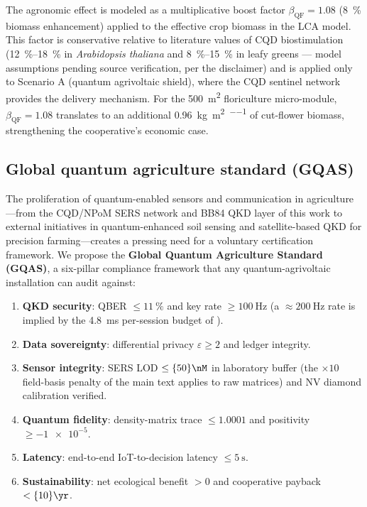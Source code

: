 \documentclass[11pt,a4paper]{article}
\begin{document}
The agronomic effect is modeled as a multiplicative boost factor $\beta_{\mathrm{QF}} =\num{1.08}$ (\qty{8}{\percent} biomass enhancement) applied to the effective crop biomass in the LCA model. This factor is conservative relative to literature values of CQD biostimulation (\qtyrange{12}{18}{\percent} in \textit{Arabidopsis thaliana} and \qtyrange{8}{15}{\percent} in leafy greens --- model assumptions pending source verification, per the  disclaimer) and is applied only to Scenario A (quantum agrivoltaic shield), where the CQD sentinel network provides the delivery mechanism. For the \qty{500}{\m\squared} floriculture micro-module, $\beta_{\mathrm{QF}} =\num{1.08}$ translates to an additional \qty{0.96}{\kg\per\m\squared\per\yr} of cut-flower biomass, strengthening the cooperative's economic case.

\subsection{Global quantum agriculture standard (GQAS)}
\label{SI-sec:gqas}

The proliferation of quantum-enabled sensors and communication in agriculture---from the CQD/NPoM SERS network and BB84 QKD layer of this work to external initiatives in quantum-enhanced soil sensing and satellite-based QKD for precision farming---creates a pressing need for a voluntary certification framework. We propose the \textbf{Global Quantum Agriculture Standard (GQAS)}, a six-pillar compliance framework that any quantum-agrivoltaic installation can audit against:
\begin{enumerate}[label=(\roman*)]
\item \textbf{QKD security}: QBER $\leq \qty{11}{\percent}$ and key rate $\geq\qty{100}{\Hz}$ (a $\approx\qty{200}{\Hz}$ rate is implied by the \qty{4.8}{\ms} per-session budget of ).
\item \textbf{Data sovereignty}: differential privacy $\varepsilon \geq 2$ and ledger integrity.
\item \textbf{Sensor integrity}: SERS LOD $\leq \qty{50}{\nM}$ in laboratory buffer (the $\times 10$ field-basis penalty of the main text applies to raw matrices) and NV diamond calibration verified.
\item \textbf{Quantum fidelity}: density-matrix trace $\leq\num{1.0001}$ and positivity $\geq\num{-1e-5}$.
\item \textbf{Latency}: end-to-end IoT-to-decision latency $\leq
\qty{5}{\s}$.
\item \textbf{Sustainability}: net ecological benefit $> 0$ and cooperative payback $< \qty{10}{\yr}$.
\end{enumerate}
\end{document}

